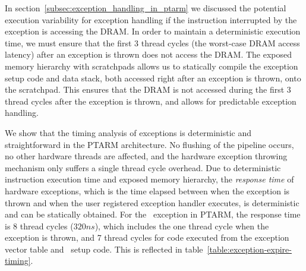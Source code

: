 In section~\ref{subsec:exception_handling_in_ptarm} we discussed the potential execution variability for exception handling if the instruction interrupted by the exception is accessing the DRAM. 
In order to maintain a deterministic execution time, we must ensure that the first 3 thread cycles (the worst-case DRAM access latency) after an exception is thrown does not access the DRAM. 
The exposed memory hierarchy with scratchpads allows us to statically compile the exception setup code and data stack, both accessed right after an exception is thrown, onto the scratchpad. 
This ensures that the DRAM is not accessed during the first 3 thread cycles after the exception is thrown, and allows for predictable exception handling.

We show that the timing analysis of exceptions is deterministic and straightforward in the PTARM architecture.
No flushing of the pipeline occurs, no other hardware threads are affected, and the hardware exception throwing mechanism only suffers a single thread cycle overhead.
Due to deterministic instruction execution time and exposed memory hierarchy, the \emph{response time} of hardware exceptions, which is the time elapsed between when the exception is thrown and when the user registered exception handler executes, is deterministic and can be statically obtained. 
For the \timerexpired\ exception in PTARM, the response time is 8 thread cycles ($320ns$), which includes the one thread cycle when the exception is thrown, and 7 thread cycles for code executed from the exception vector table and \timerexpired\ setup code.   
This is reflected in table~\ref{table:exception-expire-timing}.


